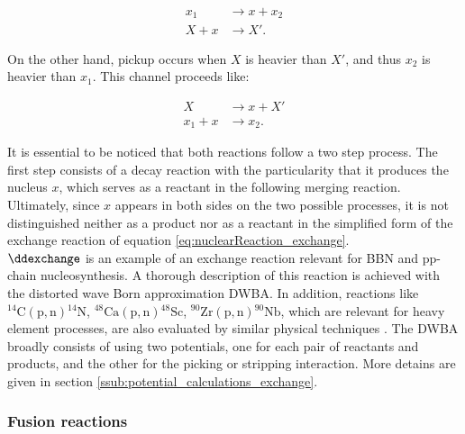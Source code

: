 \documentclass[openany]{book}
\begin{document}
\begin{equation}  \label{eq:nuclearReaction_exchange_stripping}
	\begin{split}
		x_1		&\rightarrow x  +  x_2 \\
		X + x 	&\rightarrow X'.
	\end{split}
\end{equation}

On the other hand, pickup  occurs when $X$ is heavier than $X'$, and thus $x_2$ is heavier than $x_1$. This channel proceeds like:
 
 \begin{equation}  \label{eq:nuclearReaction_exchange_pickup}
 	\begin{split}
 		X 			&\rightarrow x + X' \\
 		x_1 + x  &\rightarrow x_2.
 	\end{split}
 \end{equation}

It is essential to be noticed that both reactions follow a two step process. The first step consists of a decay reaction with the particularity that it produces the nucleus $x$, which serves as a reactant in the following merging reaction. Ultimately, since $x$ appears in both sides on the two possible processes,  it is not distinguished neither as a product nor as a reactant in the simplified form of the exchange reaction of equation \ref{eq:nuclearReaction_exchange}. \\

$\ddexchange$ is an example of an exchange reaction relevant for BBN and pp-chain nucleosynthesis. 
 A thorough description of this reaction is achieved with the distorted wave Born approximation DWBA. In addition, reactions like $\mathrm{{}^{14}C(p, n){}^{14}N}$, $\mathrm{{}^{48}Ca(p, n){}^{48}Sc}$, $\mathrm{{}^{90}Zr(p, n){}^{90}Nb}$, which are relevant for heavy element processes, are also evaluated by similar physical techniques \cite{whitehead_poxon-pearson_nunes_potel_2022}. The DWBA broadly consists of using two potentials, one for each pair of reactants and products, and the other for the picking or stripping interaction. More detains are given in section \ref{ssub:potential_calculations_exchange}. \\

\subsubsection{Fusion reactions} \label{ssub:fusionReactions}
\end{document}
